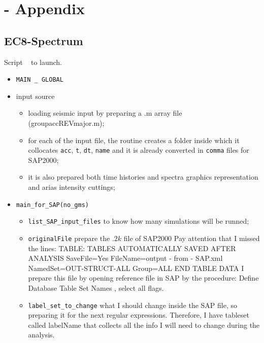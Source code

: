 \newpage
\thispagestyle{myheadings}
\chapter[Appendix A - EC8 Spectrum]{- \hspace{0.5cm} Appendix}
\section*{\LARGE{EC8-Spectrum}}
\vspace{0.5cm}
\label{app:spectra}


Script \ml~ to launch.
\begin{itemize}
    \item \verb|MAIN _ GLOBAL|
    \item input source 
            \begin{itemize}
                \item loading seismic input by preparing a .m array file (groupaccREVmajor.m);
                \item for each of the input file, the routine creates a folder inside which it collocates \verb|acc|, \verb|t|, \verb|dt|, \verb|name| and it is already converted in \verb|comma| files for SAP2000;
                \item it is also prepared both time histories and spectra graphics representation and arias intensity cuttings;
            \end{itemize}
    \item \verb|main_for_SAP(no_gms)|
            \begin{itemize}
                \item \verb|list_SAP_input_files| to know how many simulations will be runned;
                \item \verb|originalFile| prepare the .$2k$ file of SAP2000
                Pay attention that I missed the lines:
                TABLE:  TABLES AUTOMATICALLY SAVED AFTER ANALYSIS
                            SaveFile=Yes   FileName=output - from - SAP.xml   NamedSet=OUT-STRUCT-ALL   Group=ALL
                        END TABLE DATA
                        I prepare this file by opening reference file in SAP by the procedure: Define Database Table Set Names , select all flags.
                        \item \verb|label_set_to_change| what I should change inside the SAP file, so preparing it for the next regular expressions.
                        Therefore, I have tableset called labelName that collects all the info I will need to change during the analysis.
                        
            \end{itemize}
    
\end{itemize}
    
    
    
    \lstset{language=Tex,numbers=none}
       \begin{lstlisting}[frame=lines]

       \end{lstlisting}